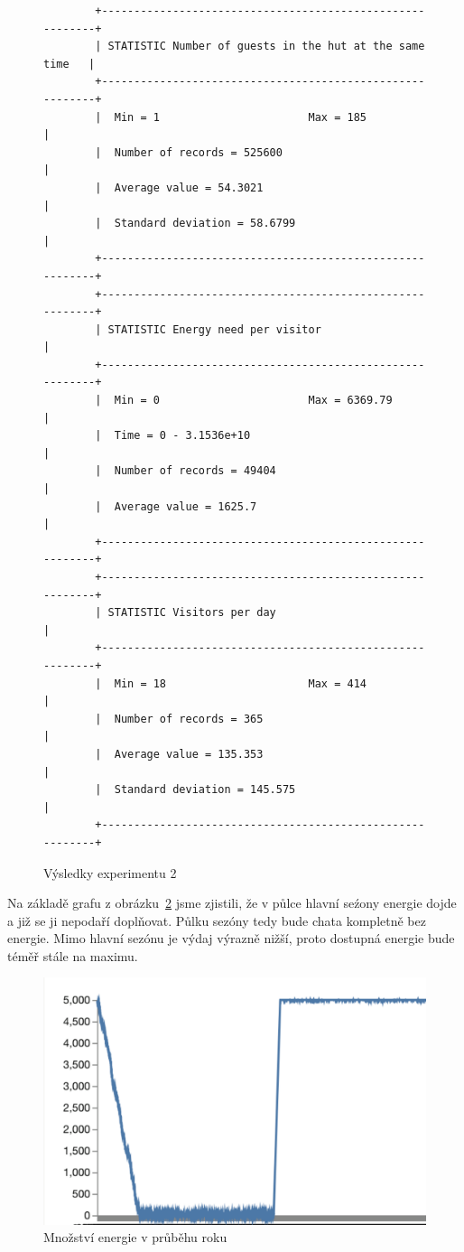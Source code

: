 \begin{figure}[H]
    \begin{verbatim}
        +----------------------------------------------------------+
        | STATISTIC Number of guests in the hut at the same time   |
        +----------------------------------------------------------+
        |  Min = 1                       Max = 185                 |
        |  Number of records = 525600                              |
        |  Average value = 54.3021                                 |
        |  Standard deviation = 58.6799                            |
        +----------------------------------------------------------+
        +----------------------------------------------------------+
        | STATISTIC Energy need per visitor                        |
        +----------------------------------------------------------+
        |  Min = 0                       Max = 6369.79             |
        |  Time = 0 - 3.1536e+10                                   |
        |  Number of records = 49404                               |
        |  Average value = 1625.7                                  |
        +----------------------------------------------------------+
        +----------------------------------------------------------+
        | STATISTIC Visitors per day                               |
        +----------------------------------------------------------+
        |  Min = 18                      Max = 414                 |
        |  Number of records = 365                                 |
        |  Average value = 135.353                                 |
        |  Standard deviation = 145.575                            |
        +----------------------------------------------------------+
    \end{verbatim}
    \caption{Výsledky experimentu 2}
    \label{tab:res_2}
\end{figure}


Na základě grafu z obrázku~\ref{fig:graph_1} jsme zjistili, že v půlce hlavní seźony energie dojde a již se ji nepodaří doplňovat. Půlku sezóny tedy bude chata kompletně bez energie. Mimo hlavní sezónu je výdaj výrazně nižší, proto dostupná energie bude téměř stále na maximu.


\begin{figure}[H]
    \centering
    \includegraphics[width=.75\textwidth]{images/graph_1.png}\hfill
    \caption{Množství energie v průběhu roku}
    \label{fig:graph_1}
\end{figure}



